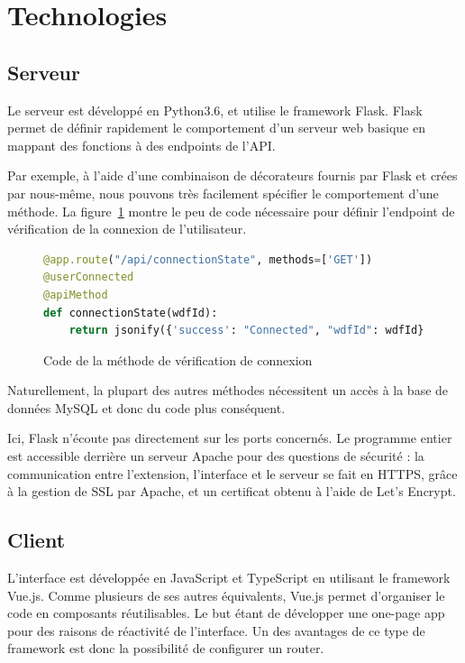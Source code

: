 
\section{Technologies}



	\subsection{Serveur}

		Le serveur est développé en Python3.6, et utilise le framework Flask. Flask permet de définir rapidement le comportement d'un serveur web basique en mappant des fonctions à des endpoints de l'API.

		Par exemple, à l'aide d'une combinaison de décorateurs fournis par Flask et crées par nous-même, nous pouvons très facilement spécifier le comportement d'une méthode. La figure~\ref{i-code-server} montre le peu de code nécessaire pour définir l'endpoint de vérification de la connexion de l'utilisateur.

		\begin{figure}[!h]
			\centering
			\begin{lstlisting}[language=python]
@app.route("/api/connectionState", methods=['GET'])
@userConnected
@apiMethod
def connectionState(wdfId):
    return jsonify({'success': "Connected", "wdfId": wdfId})\end{lstlisting}
			\caption{Code de la méthode de vérification de connexion}
			\label{i-code-server}
		\end{figure}

		Naturellement, la plupart des autres méthodes nécessitent un accès à la base de données MySQL et donc du code plus conséquent.

		Ici, Flask n'écoute pas directement sur les ports concernés. Le programme entier est accessible derrière un serveur Apache pour des questions de sécurité : la communication entre l'extension, l'interface et le serveur se fait en HTTPS, grâce à la gestion de SSL par Apache, et un certificat obtenu à l'aide de Let's Encrypt.


	\subsection{Client}

		L'interface est développée en JavaScript et TypeScript en utilisant le framework Vue.js. Comme plusieurs de ses autres équivalents, Vue.js permet d'organiser le code en composants réutilisables. Le but étant de développer une one-page app pour des raisons de réactivité de l'interface. Un des avantages de ce type de framework est donc la possibilité de configurer un router.

